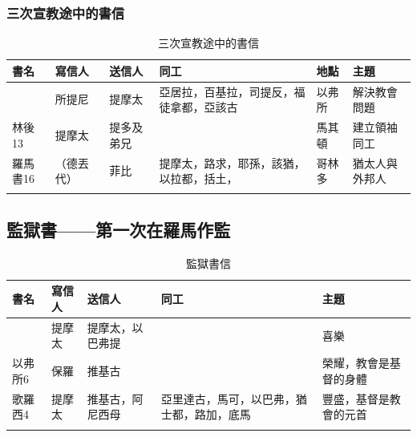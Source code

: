 \vspace*{-\baselineskip}
\subsubsection{三次宣教途中的書信}
\vspace*{-\baselineskip}
\def\rowi  {林前16 & 所提尼 & 提摩太 &亞居拉，百基拉，司提反，福徒拿都，亞該古&以弗所&解決教會問題\\}
\def\rowii  {林後13 &提摩太 & 提多及弟兄 &&馬其頓&建立領袖同工\\}
\def\rowiii{羅馬書16 & （德丟代） & 菲比&提摩太，路求，耶孫，該猶，以拉都，括土， &哥林多&猶太人與外邦人\\}
\begin{table}[!hbp]
\begin{tabular}{llllll}
\toprule
書名 & 寫信人 & 送信人&同工&地點&主題\\
\midrule
\sortfirstcol{\rowi\rowii\rowiii}
\bottomrule
\end{tabular}
\caption{三次宣教途中的書信}
\end{table}

\subsection{監獄書——第一次在羅馬作監}
\vspace*{-\baselineskip}
\def\rowi{腓立比4 & 提摩太& 提摩太，以巴弗提&&喜樂\\}
\def\rowii{以弗所6 & 保羅& 推基古&&榮耀，教會是基督的身體 \\}
\def\rowiii{歌羅西4 & 提摩太&推基古，阿尼西母 &亞里達古，馬可，以巴弗，猶士都，路加，底馬&豐盛，基督是教會的元首 \\}
\begin{table}[!hbp]
\begin{tabular}{lllll}
\toprule
書名 & 寫信人 & 送信人&同工&主題\\
\midrule
\sortfirstcol{\rowi\rowii\rowiii}
\bottomrule
\end{tabular}
\caption{監獄書信}
\end{table}


